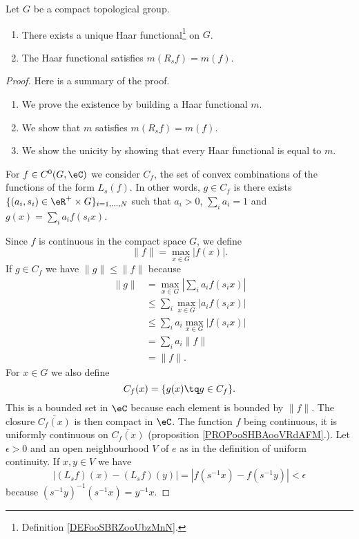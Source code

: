 \begin{theorem}       \label{THOooHZNRooLWmJMB}
	Let \( G\) be a compact topological group.
	\begin{enumerate}
		\item
		      There exists a unique Haar functional\footnote{Definition \ref{DEFooSBRZooUbzMnN}.} on \( G\).
		\item
		      The Haar functional satisfies \( m(R_sf)=m(f)\).
	\end{enumerate}
\end{theorem}

\begin{proof}
	Here is a summary of the proof.
	\begin{enumerate}
		\item
		      We prove the existence by building a Haar functional \( m\).
		\item
		      We show that \( m\) satisfies \( m(R_sf)=m(f)\).
		\item
		      We show the unicity by showing that every Haar functional is equal to \( m\).
	\end{enumerate}

	For \( f\in C^0(G,\eC)\) we consider \( C_f\), the set of convex combinations of the functions of the form \( L_s(f)\). In other words, \( g\in C_f\) is there exists \( \{ (a_i,s_i)\in \eR^+\times G \}_{i=1,\ldots, N}\) such that \( a_i>0\), \( \sum_ia_i=1\) and \( g(x)=\sum_ia_if(s_ix)\).

	Since \( f\) is continuous in the compact space \( G\), we define
	\begin{equation}
		\| f \|=\max_{x\in G}| f(x) |.
	\end{equation}
	If \( g\in C_f\) we have \( \| g \|\leq \| f \|\) because
	\begin{subequations}
		\begin{align}
			\| g \| & =\max_{x\in G}| \sum_ia_if(s_ix) |     \\
			        & \leq\sum_i\max_{x\in G}| a_if(s_ix) |  \\
			        & \leq \sum_ia_i\max_{x\in G}| f(s_ix) | \\
			        & =\sum_ia_i\| f \|                      \\
			        & =\| f \|.
		\end{align}
	\end{subequations}
	For \( x\in G\) we also define
	\begin{equation}
		C_f(x)=\{ g(x)\tq g\in C_f \}.
	\end{equation}
	This is a bounded set in \( \eC\) because each element is bounded by \( \| f \|\). The closure \( \overline{ C_f(x) }\) is then compact in \( \eC\). The function \( f\) being continuous, it is uniformly continuous on \( \overline{ C_f(x) }\) (proposition \ref{PROPooSHBAooVRdAFM}.). Let \( \epsilon>0\) and an open neighbourhood \( V\) of \( e\) as in the definition of uniform continuity. If \( x,y\in V\) we have
	\begin{equation}
		| (L_sf)(x)-(L_sf)(y) |=| f(s^{-1}x)-f(s^{-1} y) |<\epsilon
	\end{equation}
	because \( (s^{-1}y)^{-1}(s^{-1}x)=y^{-1}x\).


\end{proof}
